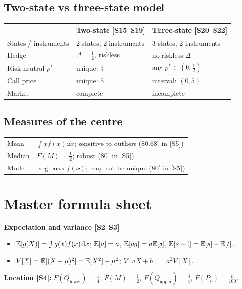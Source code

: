 \documentclass[10pt]{article}
\begin{document}
\subsection{Two-state vs three-state model}
{\small\begin{tabularx}{\linewidth}{@{}l X X@{}}\toprule
 & Two-state [S15--S19] & Three-state [S20--S22]\\\midrule
States / instruments & 2 states, 2 instruments & 3 states, 2 instruments\\
Hedge & $\Delta=\frac12$, riskless & no riskless $\Delta$\\
Risk-neutral $p^*$ & unique: $\frac12$ & any $p^*\in(0,\frac12)$\\
Call price & unique: $5$ & interval: $(0,5)$\\
Market & complete & incomplete\\\bottomrule
\end{tabularx}}
\subsection{Measures of the centre}
{\small\begin{tabularx}{\linewidth}{@{}l X@{}}\toprule
Mean & $\int xf(x)\dd x$; sensitive to outliers ($80.68^\circ$ in [S5])\\
Median & $F(M)=\frac12$; robust ($80^\circ$ in [S5])\\
Mode & $\arg\max f(x)$; may not be unique ($80^\circ$ in [S5])\\\bottomrule
\end{tabularx}}

\section{Master formula sheet}
\textbf{Expectation and variance [S2--S3]}
\begin{itemize}
\item $\mathbb{E}[g(X)]=\int g(x)f(x)\,\mathrm{d} x$; $\mathbb{E}[a]=a$, $\mathbb{E}[ag]=a\mathbb{E}[g]$, $\mathbb{E}[s+t]=\mathbb{E}[s]+\mathbb{E}[t]$.
\item $V[X]=\mathbb{E}[(X-\mu)^2]=\mathbb{E}[X^2]-\mu^2$; $V[aX+b]=a^2V[X]$.
\end{itemize}
\textbf{Location [S4]:} $F(Q_{\text{lower}})=\frac14$, $F(M)=\frac12$, $F(Q_{\text{upper}})=\frac34$, $F(P_n)=\frac{n}{100}$.
\end{document}

